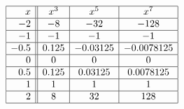 \documentclass{ximera}
\begin{document}
\begin{center}
$\begin{array}{|r||c|c|c|}  \hline

 x &  x^3 & x^5 & x^7 \\ \hline
 -2 & -8& -32& -128 \\  \hline
 -1 & -1 & -1&  -1\\  \hline
 -0.5 & 0.125 & -0.03125&  -0.0078125 \\  \hline
 0 &  0 & 0 & 0 \\  \hline
 0.5 & 0.125  &  0.03125 & 0.0078125 \\  \hline
 1&  1 & 1&  1 \\  \hline
 2 & 8 & 32 & 128 \\  \hline
\end{array}$
\end{center}

\begin{center} 
\end{center}







\end{document}
